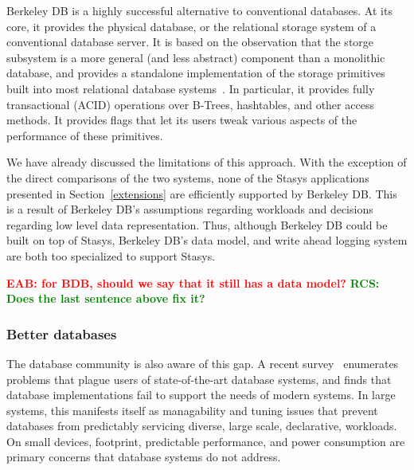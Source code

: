 \documentclass[letterpaper,twocolumn,10pt]{article}
\newcommand{\yad}{Stasys\xspace}
\newcommand{\eab}[1]{\textcolor{red}{\bf EAB: #1}}
\newcommand{\rcs}[1]{\textcolor{green}{\bf RCS: #1}}
\begin{document}
Berkeley DB is a highly successful alternative to conventional
databases.  At its core, it provides the physical database, or
the relational storage system of a conventional database server.
It is based on the
observation that the storge subsystem is a more general (and less
abstract) component than a monolithic database, and provides a
standalone implementation of the storage primitives built into 
most relational database systems~\cite{libtp}.  In particular, 
it provides fully transactional (ACID) operations over B-Trees, 
hashtables, and other access methods.  It provides flags that 
let its users tweak various aspects of the performance of these
primitives.

We have already discussed the limitations of this approach.  With the
exception of the direct comparisons of the two systems, none of the \yad 
applications presented in Section~\ref{extensions} are efficiently
supported by Berkeley DB.   This is a result of Berkeley DB's  
assumptions regarding workloads and decisions regarding low level data
representation.  Thus, although Berkeley DB could be built on top of \yad,
Berkeley DB's data model, and write ahead logging system are both too specialized to support \yad.

\eab{for BDB, should we say that it still has a data model?} \rcs{ Does the last sentence above fix it?}




\subsubsection{Better databases}

The database community is also aware of this gap. 
A recent survey~\cite{riscDB} enumerates problems that plague users of
state-of-the-art database systems, and finds that database implementations fail to support the
needs of modern systems.  In large systems, this manifests itself as
managability and tuning issues that prevent databases from predictably
servicing diverse, large scale, declarative, workloads.  
On small devices, footprint, predictable performance, and power consumption are
primary concerns that database systems do not address.

\end{document}
